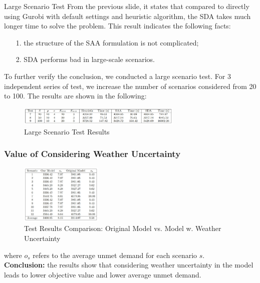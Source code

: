 \documentclass[aspectratio=169]{beamer}
\begin{document}
\begin{frame}{Large Scenario Test}
From the previous slide, it states that compared to directly using Gurobi with default settings and heuristic algorithm, the SDA takes much longer time to solve the problem. This result indicates the following facts:
\begin{itemize}
    \item[1.] the structure of the SAA formulation is not complicated;
    \item[2.] SDA performs bad in large-scale scenarios.  
\end{itemize}
To further verify the conclusion, we conducted a large scenario test. For 3 independent series of test, we increase the number of scenarios considered from 20 to 100. The results are shown in the following:
\begin{figure}
    \centering
    \includegraphics[width=0.7\textwidth]{fig_largeStest.png}
    \caption{Large Scenario Test Results}
    \label{fig:large_scenario}
\end{figure}
\end{frame}


\begin{frame}\frametitle{Value of Considering Weather Uncertainty}
\begin{figure}
    \centering
    \includegraphics[width=0.35\textwidth]{fig_value_wind_uncertainty.png}
    \caption{\small Test Results Comparison: Original Model vs. Model w. Weather Uncertainty}
    \label{fig:weather_uncertainty}
\end{figure}
where $o_s$ refers to the average unmet demand for each scenario $s$. \\
\textbf{Conclusion:} the results show that considering weather uncertainty in the model leads to lower objective value and lower average unmet demand.

\end{frame}
\end{document}
